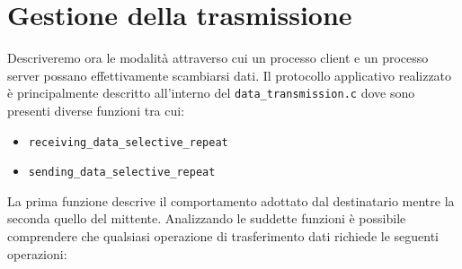 \documentclass[10pt,a4paper, titlepage]{report}
\begin{document}
\newpage

\section{Gestione della trasmissione}\label{sub:gestione-della-trasmissione}

Descriveremo ora le modalità attraverso cui un processo client e un processo server possano effettivamente scambiarsi dati. Il protocollo applicativo realizzato è principalmente descritto all'interno del \texttt{data\_transmission.c} dove sono presenti diverse funzioni tra cui:

\begin{itemize}
\item \texttt{receiving\_data\_selective\_repeat}
\item \texttt{sending\_data\_selective\_repeat}
\end{itemize}

La prima funzione descrive il comportamento adottato dal destinatario mentre la seconda quello del mittente. Analizzando le suddette funzioni è possibile comprendere che qualsiasi operazione di trasferimento dati richiede le seguenti operazioni: 
\end{document}
